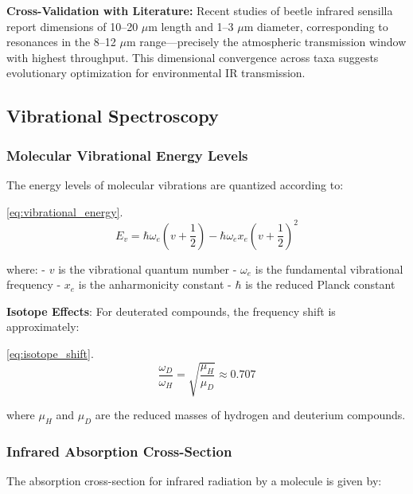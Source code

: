 \documentclass[
  13pt,
  a4paperpaper,
  12pt]{article}
\begin{document}
\textbf{Cross-Validation with Literature:} Recent studies of beetle
infrared sensilla report dimensions of 10--20 \(\mu\mathrm{m}\) length
and 1--3 \(\mu\mathrm{m}\) diameter, corresponding to resonances in the
8--12 \(\mu\mathrm{m}\) range---precisely the atmospheric transmission
window with highest throughput. This dimensional convergence across taxa
suggests evolutionary optimization for environmental IR transmission.

\subsection{Vibrational Spectroscopy}\label{vibrational-spectroscopy}

\subsubsection{Molecular Vibrational Energy
Levels}\label{molecular-vibrational-energy-levels}

The energy levels of molecular vibrations are quantized according to:

\eqref{eq:vibrational_energy}. \begin{equation}
E_v = \hbar \omega_e \left(v + \frac{1}{2}\right) - \hbar \omega_e x_e \left(v + \frac{1}{2}\right)^2 \label{eq:vibrational_energy}
\end{equation}

where: - \(v\) is the vibrational quantum number - \(\omega_e\) is the
fundamental vibrational frequency - \(x_e\) is the anharmonicity
constant - \(\hbar\) is the reduced Planck constant

\textbf{Isotope Effects}: For deuterated compounds, the frequency shift
is approximately:

\eqref{eq:isotope_shift}. \begin{equation}
\frac{\omega_D}{\omega_H} = \sqrt{\frac{\mu_H}{\mu_D}} \approx 0.707 \label{eq:isotope_shift}
\end{equation}

where \(\mu_H\) and \(\mu_D\) are the reduced masses of hydrogen and
deuterium compounds.

\subsubsection{Infrared Absorption
Cross-Section}\label{infrared-absorption-cross-section}

The absorption cross-section for infrared radiation by a molecule is
given by:
\end{document}
